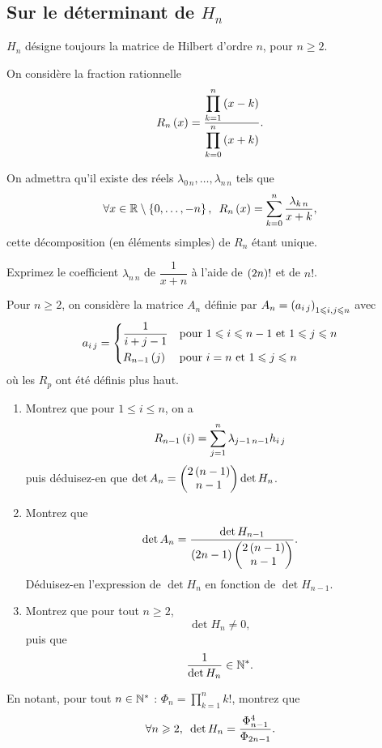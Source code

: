 \subsection*{Sur le déterminant de \(H_n\)}

\(H_n\) désigne toujours la matrice de Hilbert d'ordre \(n\), pour \(n\geq2\).

\begin{q}
On considère la fraction rationnelle \[R_n\paren{x}=\dfrac{\ds\prod_{k=1}^n\paren{x-k}}{\ds\prod_{k=0}^n\paren{x+k}}.\]

On admettra qu'il existe des réels \(\lambda_{0\,n},\dots,\lambda_{n\,n}\) tels que \[\quantifs{\forall x\in\R\excluant\accol{0,\dots,-n}}R_n\paren{x}=\sum_{k=0}^n\dfrac{\lambda_{k\,n}}{x+k},\] cette décomposition (en éléments simples) de \(R_n\) étant unique.

Exprimez le coefficient \(\lambda_{n\,n}\) de \(\dfrac{1}{x+n}\) à l'aide de \(\paren{2n}!\) et de \(n!\).
\end{q}

\begin{q}[Matrice \(A_n\)]
Pour \(n\geq2\), on considère la matrice \(A_n\) définie par \(A_n=\paren{a_{i\,j}}_{1\leq i,j\leq n}\) avec \[a_{i\,j}=\begin{dcases}
\dfrac{1}{i+j-1} &\text{pour }1\leq i\leq n-1\text{ et }1\leq j\leq n \\
R_{n-1}\paren{j} &\text{pour }i=n\text{ et }1\leq j\leq n
\end{dcases}\] où les \(R_p\) ont été définis plus haut.

\begin{enumerate}
    \item Montrez que pour \(1\leq i\leq n\), on a \[R_{n-1}\paren{i}=\sum_{j=1}^n\lambda_{j-1\,n-1}h_{i\,j}\] puis déduisez-en que \(\det A_n=\binom{n-1}{2\paren{n-1}}\det H_n\). \\
    \item Montrez que \[\det A_n=\dfrac{\det H_{n-1}}{\paren{2n-1}\binom{n-1}{2\paren{n-1}}}.\] Déduisez-en l'expression de \(\det H_n\) en fonction de \(\det H_{n-1}\). \\
    \item Montrez que pour tout \(n\geq2\), \[\det H_n\not=0,\] puis que \[\dfrac{1}{\det H_n}\in\Ns.\]
\end{enumerate}
\end{q}

\begin{q}
En notant, pour tout \(n\in\Ns\) : \(\Phi_n=\prod_{k=1}^nk!\), montrez que \[\quantifs{\forall n\geq2}\det H_n=\dfrac{\Phi_{n-1}^4}{\Phi_{2n-1}}.\]
\end{q}
